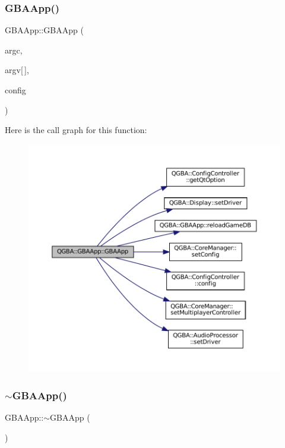 \subsubsection{\texorpdfstring{G\+B\+A\+App()}{GBAApp()}}
{\footnotesize\ttfamily G\+B\+A\+App\+::\+G\+B\+A\+App (\begin{DoxyParamCaption}\item[{\mbox{\hyperlink{ioapi_8h_a787fa3cf048117ba7123753c1e74fcd6}{int}} \&}]{argc,  }\item[{char $\ast$}]{argv\mbox{[}$\,$\mbox{]},  }\item[{\mbox{\hyperlink{class_q_g_b_a_1_1_config_controller}{Config\+Controller}} $\ast$}]{config }\end{DoxyParamCaption})}

Here is the call graph for this function\+:
\nopagebreak
\begin{figure}[H]
\begin{center}
\leavevmode
\includegraphics[width=350pt]{class_q_g_b_a_1_1_g_b_a_app_a00713e773289a850303d8954b0ebefbc_cgraph}
\end{center}
\end{figure}
\mbox{\label{class_q_g_b_a_1_1_g_b_a_app_a74f49233dd4c7588df98dc7adbbcf031}} 
\subsubsection{\texorpdfstring{$\sim$\+G\+B\+A\+App()}{~GBAApp()}}
{\footnotesize\ttfamily G\+B\+A\+App\+::$\sim$\+G\+B\+A\+App (\begin{DoxyParamCaption}{ }\end{DoxyParamCaption})}



